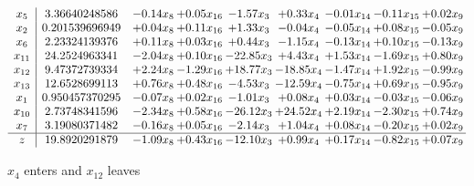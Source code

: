 \documentclass[9pt]{article}
\begin{document}
 \[\begin{array}{c| c c@{\hskip 2pt} c@{\hskip 2pt} c@{\hskip 2pt} c@{\hskip 2pt} c@{\hskip 2pt} c@{\hskip 2pt} c@{\hskip 2pt} }
 x_{5}   &  3.36640248586 & -0.14 x_{8} & +  0.05 x_{16} & -1.57 x_{3} & +  0.33 x_{4} & -0.01 x_{14} & -0.11 x_{15} & +  0.02 x_{9}\\
 x_{2}   &  0.201539696949 & +  0.04 x_{8} & +  0.11 x_{16} & +  1.33 x_{3} & -0.04 x_{4} & -0.05 x_{14} & +  0.08 x_{15} & -0.05 x_{9}\\
 x_{6}   &  2.23324139376 & +  0.11 x_{8} & +  0.03 x_{16} & +  0.44 x_{3} & -1.15 x_{4} & -0.13 x_{14} & +  0.10 x_{15} & -0.13 x_{9}\\
 x_{11}   &  24.2524963341 & -2.04 x_{8} & +  0.10 x_{16} & -22.85 x_{3} & +  4.43 x_{4} & +  1.53 x_{14} & -1.69 x_{15} & +  0.80 x_{9}\\
 x_{12}   &  9.47372739334 & +  2.24 x_{8} & -1.29 x_{16} & + 18.77 x_{3} & -18.85 x_{4} & -1.47 x_{14} & +  1.92 x_{15} & -0.99 x_{9}\\
 x_{13}   &  12.6528699113 & +  0.76 x_{8} & +  0.48 x_{16} & -4.53 x_{3} & -12.59 x_{4} & -0.75 x_{14} & +  0.69 x_{15} & -0.95 x_{9}\\
 x_{1}   &  0.950457370295 & -0.07 x_{8} & +  0.02 x_{16} & -1.01 x_{3} & +  0.08 x_{4} & +  0.03 x_{14} & -0.03 x_{15} & -0.06 x_{9}\\
 x_{10}   &  2.73748341596 & -2.34 x_{8} & +  0.58 x_{16} & -26.12 x_{3} & + 24.52 x_{4} & +  2.19 x_{14} & -2.30 x_{15} & +  0.74 x_{9}\\
 x_{7}   &  3.19080371482 & -0.16 x_{8} & +  0.05 x_{16} & -2.14 x_{3} & +  1.04 x_{4} & +  0.08 x_{14} & -0.20 x_{15} & +  0.02 x_{9}\\
\hline
z    &  19.8920291879 & -1.09 x_{8} & +  0.43 x_{16} & -12.10 x_{3} & +  0.99 x_{4} & +  0.17 x_{14} & -0.82 x_{15} & +  0.07 x_{9}\\
\end{array}\]


 $ x_{4} $ enters and $ x_{12} $ leaves 
\end{document}
